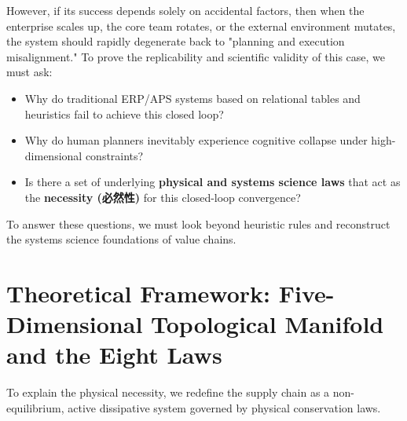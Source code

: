 \documentclass[11pt,a4paper]{article}
\begin{document}
However, if its success depends solely on accidental factors, then when the enterprise scales up, the core team rotates, or the external environment mutates, the system should rapidly degenerate back to "planning and execution misalignment." To prove the replicability and scientific validity of this case, we must ask:
\begin{itemize}
    \item Why do traditional ERP/APS systems based on relational tables and heuristics fail to achieve this closed loop?
    \item Why do human planners inevitably experience cognitive collapse under high-dimensional constraints?
    \item Is there a set of underlying \textbf{physical and systems science laws} that act as the \textbf{necessity (必然性)} for this closed-loop convergence?
\end{itemize}

To answer these questions, we must look beyond heuristic rules and reconstruct the systems science foundations of value chains.

\section{Theoretical Framework: Five-Dimensional Topological Manifold and the Eight Laws}
To explain the physical necessity, we redefine the supply chain as a non-equilibrium, active dissipative system governed by physical conservation laws.
\end{document}
